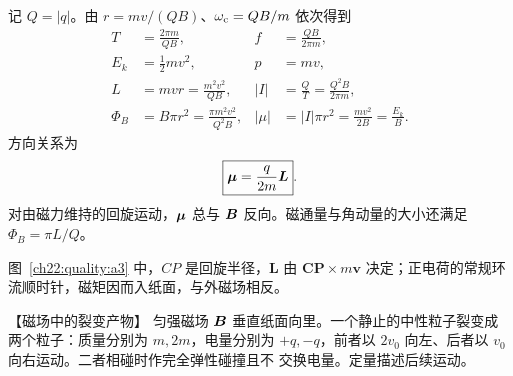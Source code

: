 {\begin{xesolution}
\begin{center}
\begin{minipage}{.96\linewidth}
\begin{tikzpicture}[>=Latex,font=\small,every node/.style={fill=none},scale=.88]
\end{tikzpicture}
\end{minipage}\end{center}

记 $Q=|q|$。由 $r=mv/(QB)$、$\omega_{\rm c}=QB/m$ 依次得到
\begin{align}
  T&=\frac{2\pi m}{QB},
  & f&=\frac{QB}{2\pi m},\\
  E_k&=\frac12mv^2,
  & p&=mv,\\
  L&=mvr=\frac{m^2v^2}{QB},
  & |I|&=\frac{Q}{T}=\frac{Q^2B}{2\pi m},\\
  \Phi_B&=B\pi r^2=\frac{\pi m^2v^2}{Q^2B},
  & |\mu|&=|I|\pi r^2=\frac{mv^2}{2B}=\frac{E_k}{B}.
\end{align}
方向关系为
\begin{equation}
  \boxed{\bm{\mu}=\frac{q}{2m}\bm{L}}.
\end{equation}
对由磁力维持的回旋运动，$\bm{\mu}$ 总与 $\bm{B}$ 反向。磁通量与角动量的大小还满足
$\Phi_B=\pi L/Q$。

图~\ref{ch22:quality:a3} 中，$CP$ 是回旋半径，$\boldsymbol L$ 由 $\boldsymbol{CP}\times m\boldsymbol v$ 决定；正电荷的常规环流顺时针，磁矩因而入纸面，与外磁场相反。
\end{xesolution}



\begin{origexamplebox}{【磁场中的裂变产物】}\label{ch22:ex:s38-7-4}
匀强磁场 $\bm{B}$ 垂直纸面向里。一个静止的中性粒子裂变成两个粒子：质量分别为
$m,2m$，电量分别为 $+q,-q$，前者以 $2v_0$ 向左、后者以 $v_0$ 向右运动。二者相碰时作完全弹性碰撞且不
交换电量。定量描述后续运动。

\begin{center}
\end{center}
\end{origexamplebox}\par\nopagebreak[4]

}
